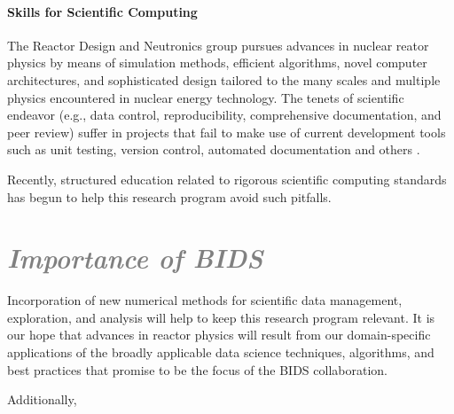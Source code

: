 \documentclass[a4paper, 12pt]{article}
\begin{document}
\paragraph{Skills for Scientific Computing}
The Reactor Design and Neutronics group pursues advances in nuclear reator 
physics by means of simulation methods, 
efficient algorithms, novel computer architectures, and sophisticated design 
tailored to the many scales and multiple physics encountered in nuclear energy 
technology.  The tenets of scientific endeavor (e.g., data control, 
reproducibility, comprehensive documentation, and peer review) suffer in 
projects that fail to make use of current development tools such as unit 
testing, version control, automated documentation and others 
\cite{wilson_best_2014, merali_computational_2010}. 

Recently, structured education \cite{huff_hacker_2014, huff_rapid_2011} related 
to rigorous scientific computing standards has begun to help this research 
program avoid such pitfalls. 


\section*{\textcolor{gray}{\it Importance of BIDS}}

Incorporation of new numerical methods for scientific data management, 
exploration, and analysis will help to keep this research program relevant. 
It is our hope that advances in reactor physics will result from our 
domain-specific applications of the broadly applicable data science techniques, 
algorithms, and best practices that promise to be the focus of the BIDS 
collaboration.


Additionally, 



\end{document}

